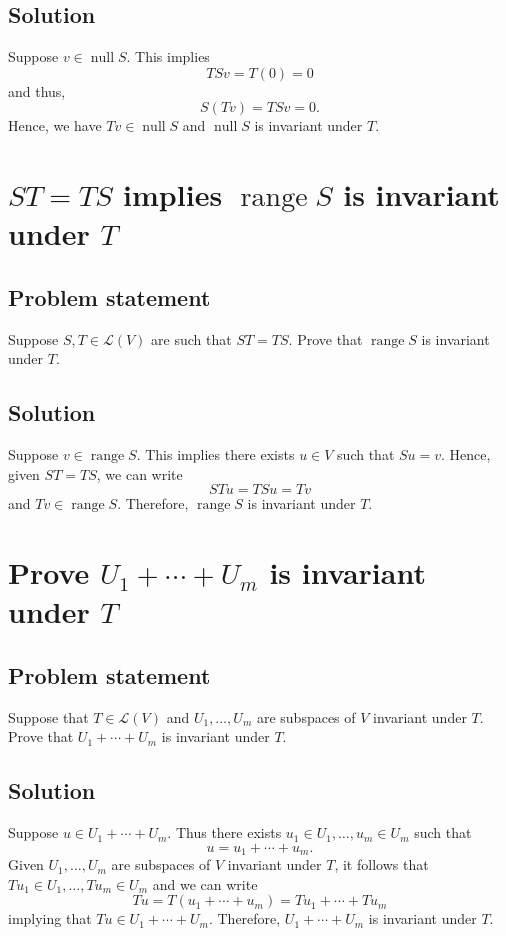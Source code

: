 \documentclass{article}
\begin{document}
\subsection*{Solution}
Suppose $v\in\operatorname{null}S$. 
This implies
\[TSv=T(0)=0\]
and thus, 
\[S(Tv)=TSv=0.\]
Hence, we have $Tv\in\operatorname{null}S$ and $\operatorname{null}S$ is invariant under $T$.

\clearpage

\section{$ST=TS$ implies $\operatorname{range}S$ is invariant under $T$}
\subsection*{Problem statement}
Suppose $S,T\in\mathcal{L}(V)$ are such that $ST=TS$. 
Prove that $\operatorname{range}S$ is invariant under $T$.

\subsection*{Solution}
Suppose $v\in\operatorname{range}S$. 
This implies there exists $u\in V$ such that $Su=v$. 
Hence, given $ST=TS$, we can write
\[STu=TSu=Tv\]
and $Tv\in\operatorname{range}S$. 
Therefore, $\operatorname{range}S$ is invariant under $T$.

\clearpage

\section{Prove $U_1+\cdots+U_m$ is invariant under $T$}
\subsection*{Problem statement}
Suppose that $T\in\mathcal{L}(V)$ and $U_1,\ldots,U_m$ are subspaces of $V$ invariant under $T$. 
Prove that $U_1+\cdots+U_m$ is invariant under $T$.

\subsection*{Solution}
Suppose $u\in U_1+\cdots+U_m$. 
Thus there exists $u_1\in U_1,\ldots,u_m\in U_m$ such that
\[u=u_1+\cdots+u_m.\]
Given $U_1,\ldots,U_m$ are subspaces of $V$ invariant under $T$, it follows that\newline $Tu_1\in U_1,\ldots,Tu_m\in U_m$ and we can write
\[Tu=T(u_1+\cdots+u_m)=Tu_1+\cdots+Tu_m\]
implying that $Tu\in U_1+\cdots+U_m$.
Therefore, $U_1+\cdots+U_m$ is invariant under $T$.
\end{document}
